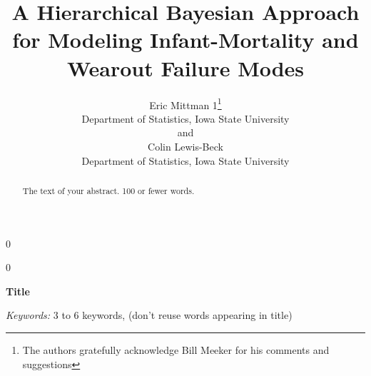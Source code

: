 \documentclass[12pt]{article}
\newcommand{\blind}{0}
\begin{document}
%

\def\spacingset#1{\renewcommand{\baselinestretch}%
{#1}\small\normalsize} \spacingset{1}



\blind
{
  \title{\bf A Hierarchical Bayesian Approach for Modeling Infant-Mortality and Wearout Failure Modes}
  \author{Eric Mittman 1\thanks{
    The authors gratefully acknowledge Bill Meeker for his comments and suggestions}\hspace{.2cm}\\
    Department of Statistics, Iowa State University\\
    and \\
    Colin Lewis-Beck \\
    Department of Statistics, Iowa State University}
  \maketitle
} \fi

\blind
{
  \bigskip
  \bigskip
  \bigskip
  \begin{center}
    {\LARGE\bf Title}
\end{center}
  \medskip
} \fi

\bigskip
\begin{abstract}
The text of your abstract.  100 or fewer words.
\end{abstract}

\noindent%
{\it Keywords:}  3 to 6 keywords, (don't reuse words appearing in title)
\vfill

\newpage
\spacingset{1.45} %
\end{document}
